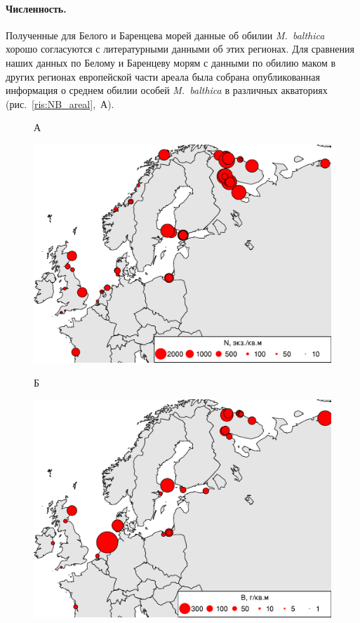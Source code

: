 {\paragraph{Численность.}
Полученные для Белого и Баренцева морей данные об обилии \textit{M.~balthica} хорошо согласуются с литературными данными об этих регионах.
Для сравнения наших данных по Белому и Баренцеву морям с данными по обилию маком в других регионах европейской части ареала была собрана опубликованная информация о среднем обилии особей {\it M.~balthica} в различных акваториях (рис.~\ref{ris:NB_areal},~А).
	\begin{figure}[]
		\begin{minipage}[b]{.5\linewidth}
			{\small А}
			\begin{center}
			    \includegraphics[width=\textwidth]{../macrodistribution/Nmean_ru1.pdf}
			\end{center}
		\end{minipage}
	\hfil %
		\begin{minipage}[b]{.5\linewidth}
			{\small Б}
			\begin{center}
				\includegraphics[width=\textwidth]{../macrodistribution/Bmean_ru1.pdf}

\end{center}
\end{minipage}
\end{figure}}

